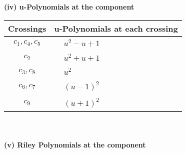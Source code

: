 \documentclass[1p]{elsarticle_modified}
\theoremstyle{definition}
\begin{document}
\newpage\renewcommand{\arraystretch}{1}
\flushleft \textbf{(iv) u-Polynomials at the component}\newline \\
\begin{tabular}{m{50pt}|m{274pt}}
Crossings & \hspace{64pt}u-Polynomials at each crossing \\
\hline $$\begin{aligned}c_{1},c_{4},c_{5}\end{aligned}$$&$\begin{aligned}
&u^2- u+1
\end{aligned}$\\
\hline $$\begin{aligned}c_{2}\end{aligned}$$&$\begin{aligned}
&u^2+u+1
\end{aligned}$\\
\hline $$\begin{aligned}c_{3},c_{8}\end{aligned}$$&$\begin{aligned}
&u^2
\end{aligned}$\\
\hline $$\begin{aligned}c_{6},c_{7}\end{aligned}$$&$\begin{aligned}
&(u-1)^2
\end{aligned}$\\
\hline $$\begin{aligned}c_{9}\end{aligned}$$&$\begin{aligned}
&(u+1)^2
\end{aligned}$\\
\hline
\end{tabular}\\~\\
\newpage\renewcommand{\arraystretch}{1}
\flushleft \textbf{(v) Riley Polynomials at the component}\newline \\
\end{document}
